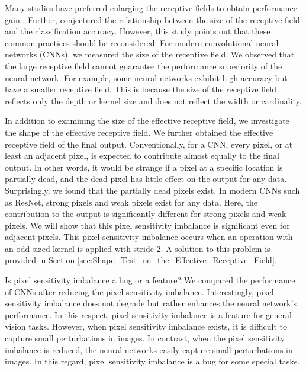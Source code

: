 \documentclass[letterpaper]{article} \usepackage{aaai22}  \usepackage{times}  \usepackage{helvet}  \usepackage{courier}  \usepackage[hyphens]{url}  \usepackage{graphicx} \urlstyle{rm} \def\UrlFont{\rm}  \usepackage{natbib}  \usepackage{caption} \DeclareCaptionStyle{ruled}{labelfont=normalfont,labelsep=colon,strut=off} \frenchspacing  \setlength{\pdfpagewidth}{8.5in}  \setlength{\pdfpageheight}{11in}  \usepackage{algorithm}
\begin{document}
Many studies have preferred enlarging the receptive fields to obtain performance gain \cite{tsai2018learning,fu2018deep,singh2018analysis,kim2016accurate,johnson2016perceptual,shi2020pv,plotz2018neural}. Further, \citet{araujo2019computing} conjectured the relationship between the size of the receptive field and the classification accuracy. However, this study points out that these common practices should be reconsidered. For modern convolutional neural networks (CNNs), we measured the size of the receptive field. We observed that the large receptive field cannot guarantee the performance superiority of the neural network. For example, some neural networks exhibit high accuracy but have a smaller receptive field. This is because the size of the receptive field reflects only the depth or kernel size and does not reflect the width or cardinality.

In addition to examining the size of the effective receptive field, we investigate the shape of the effective receptive field. We further obtained the effective receptive field of the final output. Conventionally, for a CNN, every pixel, or at least an adjacent pixel, is expected to contribute almost equally to the final output. In other words, it would be strange if a pixel at a specific location is partially dead, and the dead pixel has little effect on the output for any data. Surprisingly, we found that the partially dead pixels exist. In modern CNNs such as ResNet, strong pixels and weak pixels exist for any data. Here, the contribution to the output is significantly different for strong pixels and weak pixels. We will show that this pixel sensitivity imbalance is significant even for adjacent pixels. This pixel sensitivity imbalance occurs when an operation with an odd-sized kernel is applied with stride 2. A solution to this problem is provided in Section \ref{sec:Shape_Test_on_the_Effective_Receptive_Field}.

Is pixel sensitivity imbalance a bug or a feature? We compared the performance of CNNs after reducing the pixel sensitivity imbalance. Interestingly, pixel sensitivity imbalance does not degrade but rather enhances the neural network's performance. In this respect, pixel sensitivity imbalance is a feature for general vision tasks. However, when pixel sensitivity imbalance exists, it is difficult to capture small perturbations in images. In contrast, when the pixel sensitivity imbalance is reduced, the neural networks easily capture small perturbations in images. In this regard, pixel sensitivity imbalance is a bug for some special tasks.
\end{document}

